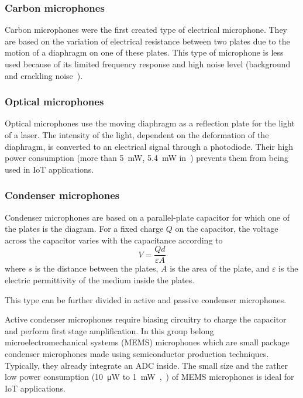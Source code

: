 \documentclass{EPL-master-thesis-covers-EN}
\begin{document}
\subsubsection*{Carbon microphones}

Carbon microphones were the first created type of electrical microphone. They are based on the variation of electrical resistance between two plates due to the motion of a diaphragm on one of these plates. This type of microphone is less used because of its limited frequency response and high noise level (background and crackling noise~\cite{background.noise}).

\subsubsection*{Optical microphones}

Optical microphones use the moving diaphragm as a reflection plate for the light of a laser. The intensity of the light, dependent on the deformation of the diaphragm, is converted to an electrical signal through a photodiode. Their high power consumption (more than \SI{5}{mW}, \SI{5.4}{mW} in~\cite{optical_microphone})  prevents them from being used in IoT applications.

\subsubsection*{Condenser microphones}

Condenser microphones are based on a parallel-plate capacitor for which one of the plates is the diagram. For a fixed charge $Q$ on the capacitor, the voltage across the capacitor varies with the capacitance according to
\[
V = \frac{Qd}{\varepsilon A}
\]
where $s$ is the distance between the plates, $A$ is the area of the plate, and $\varepsilon$ is the electric permittivity of the medium inside the plates.

This type can be further divided in active and passive condenser microphones.

Active condenser microphones require biasing circuitry to charge the capacitor and perform first stage amplification. In this group belong microelectromechanical systems (MEMS) microphones which are small package condenser microphones made using semiconductor production techniques. Typically, they already integrate an ADC inside. The small size and the rather low power consumption (\SI{10}{\micro W} to  \SI{1}{mW}~\cite{ICS40720},~\cite{10.3390/mi9070323}) of MEMS microphones is ideal for IoT applications.
 
\end{document}
